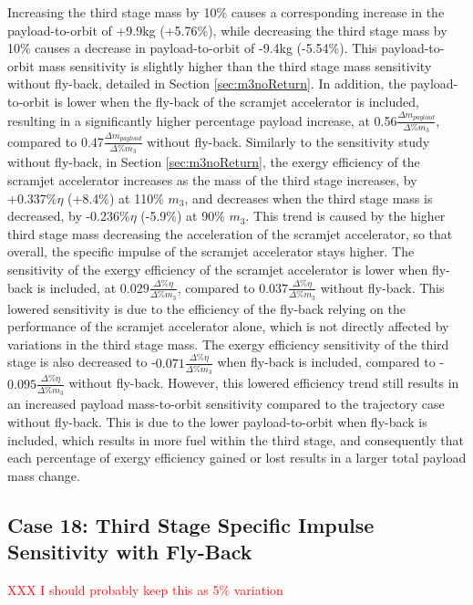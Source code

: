 Increasing the third stage mass by 10\% causes a corresponding increase in the payload-to-orbit of +9.9kg (+5.76\%), while decreasing the third stage mass by 10\% causes a decrease in payload-to-orbit of -9.4kg (-5.54\%). 
This payload-to-orbit mass sensitivity is slightly higher than the third stage mass sensitivity without fly-back, detailed in Section \ref{sec:m3noReturn}. In addition, the payload-to-orbit is lower when the fly-back of the scramjet accelerator is included, resulting in a significantly higher percentage payload increase, at 0.56$\frac{\Delta m_{payload}}{\Delta\%m_3}$, compared to 0.47$\frac{\Delta m_{payload}}{\Delta\%m_3}$ without fly-back. 
Similarly to the sensitivity study without fly-back, in Section \ref{sec:m3noReturn}, the exergy efficiency of the scramjet accelerator increases as the mass of the third stage increases, by +0.337\%$\eta$ (+8.4\%) at 110\% $m_3$, and decreases when the third stage mass is decreased, by -0.236\%$\eta$ (-5.9\%) at 90\% $m_3$.
This trend is caused by the higher third stage mass decreasing the acceleration of the scramjet accelerator, so that overall, the specific impulse of the scramjet accelerator stays higher. 
The sensitivity of the exergy efficiency of the scramjet accelerator is lower when fly-back is included, at $0.029\frac{\Delta\%\eta}{\Delta\%m_3}$, compared to $0.037\frac{\Delta\%\eta}{\Delta\%m_3}$ without fly-back. This lowered sensitivity is due to the efficiency of the fly-back relying on the performance of the scramjet accelerator alone, which is not directly affected by variations in the third stage mass.  
 The exergy efficiency sensitivity of the third stage is also decreased to -$0.071\frac{\Delta\%\eta}{\Delta\%m_3}$ when fly-back is included, compared to -$0.095\frac{\Delta\%\eta}{\Delta\%m_3}$ without fly-back. 
However, this lowered efficiency trend still results in an increased payload mass-to-orbit sensitivity compared to the trajectory case without fly-back. This is due to the lower payload-to-orbit when fly-back is included, which results in more fuel within the third stage, and consequently that each percentage of exergy efficiency gained or lost results in a larger total payload mass change. 

\subsection{Case 18: Third Stage Specific Impulse Sensitivity with Fly-Back}

\textcolor{red}{XXX I should probably keep this as 5\% variation}

